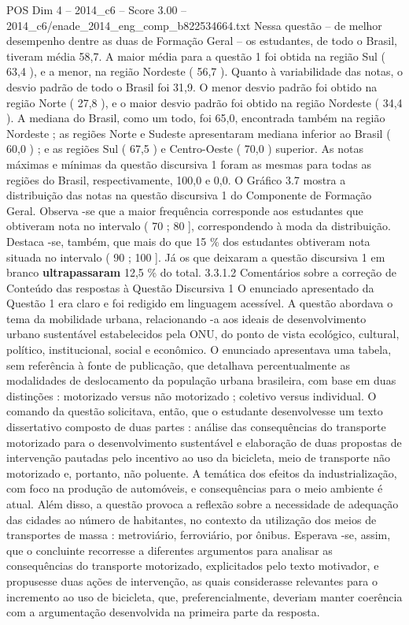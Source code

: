 \begin{textsample}{POS Dim 4 – 2014\_c6 – Score 3.00 – 2014\_c6/enade\_2014\_eng\_comp\_b822534664.txt}
Nessa questão – de melhor desempenho dentre as duas de Formação Geral – os estudantes, de todo o Brasil, tiveram média 58,7.
A maior média para a questão 1 foi obtida na região Sul ( 63,4 ), e a menor, na região Nordeste ( 56,7 ).
Quanto à variabilidade das notas, o desvio padrão de todo o Brasil foi 31,9.
O menor desvio padrão foi obtido na região Norte ( 27,8 ), e o maior desvio padrão foi obtido na região Nordeste ( 34,4 ).
A mediana do Brasil, como um todo, foi 65,0, encontrada também na região Nordeste ; as regiões Norte e Sudeste apresentaram mediana inferior ao Brasil ( 60,0 ) ; e as regiões Sul ( 67,5 ) e Centro-Oeste ( 70,0 ) superior.
As notas máximas e mínimas da questão discursiva 1 foram as mesmas para todas as regiões do Brasil, respectivamente, 100,0 e 0,0.
O Gráfico 3.7 mostra a distribuição das notas na questão discursiva 1 do Componente de Formação Geral.
Observa -se que a maior frequência corresponde aos estudantes que obtiveram nota no intervalo ( 70 ; 80 ], correspondendo à moda da distribuição.
Destaca -se, também, que mais do que 15 \% dos estudantes obtiveram nota situada no intervalo ( 90 ; 100 ].
Já os que deixaram a questão discursiva 1 em branco \textbf{ultrapassaram} 12,5 \% do total. 3.3.1.2 Comentários sobre a correção de Conteúdo das respostas à Questão Discursiva 1 O enunciado apresentado da Questão 1 era claro e foi redigido em linguagem acessível.
A questão abordava o tema da mobilidade urbana, relacionando -a aos ideais de desenvolvimento urbano sustentável estabelecidos pela ONU, do ponto de vista ecológico, cultural, político, institucional, social e econômico.
O enunciado apresentava uma tabela, sem referência à fonte de publicação, que detalhava percentualmente as modalidades de deslocamento da população urbana brasileira, com base em duas distinções : motorizado versus não motorizado ; coletivo versus individual.
O comando da questão solicitava, então, que o estudante desenvolvesse um texto dissertativo composto de duas partes : análise das consequências do transporte motorizado para o desenvolvimento sustentável e elaboração de duas propostas de intervenção pautadas pelo incentivo ao uso da bicicleta, meio de transporte não motorizado e, portanto, não poluente.
A temática dos efeitos da industrialização, com foco na produção de automóveis, e consequências para o meio ambiente é atual.
Além disso, a questão provoca a reflexão sobre a necessidade de adequação das cidades ao número de habitantes, no contexto da utilização dos meios de transportes de massa : metroviário, ferroviário, por ônibus.
Esperava -se, assim, que o concluinte recorresse a diferentes argumentos para analisar as consequências do transporte motorizado, explicitados pelo texto motivador, e propusesse duas ações de intervenção, as quais considerasse relevantes para o incremento ao uso de bicicleta, que, preferencialmente, deveriam manter coerência com a argumentação desenvolvida na primeira parte da resposta.

\end{textsample}
